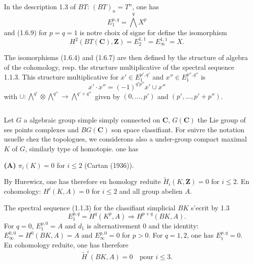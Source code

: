 \documentclass[11pt,a4paper]{article}
\theoremstyle{plain}
\theoremstyle{definition}
\begin{document}
In the description 1.3 of $BT$: $(BT)_n = T^n$, one has
\begin{equation}\label{1.6.9}
E_1^{p,q} = \bigwedge^q X^p
\end{equation}
and (1.6.9) for $p = q = 1$ is notre choix of signe for define the isomorphism
\begin{equation}\label{1.6.10}
H^2(BT(\mathbf{C}), \mathbf{Z}) = E_2^{1,1} = E_\infty^{1,1} = X.
\end{equation}

The isomorphisms (1.6.4) and (1.6.7) are then defined by the structure of algebra of the cohomology, resp. the structure multiplicative of the spectral sequence 1.1.3. This structure multiplicative for $x' \in E_1^{p',q'}$ and $x'' \in E_1^{p'',q''}$ is
\[
x' \cdot x'' = (-1)^{q'p''} x' \cup x''
\]
with $\cup : \bigwedge^{q'} \otimes \bigwedge^{q''} \to \bigwedge^{q'+q''}$ given by $(0, \ldots, p')$ and $(p', \ldots, p'+p'')$.

\subsection{}\label{1.7}

Let $G$ a algebraic group simple simply connected on $\mathbf{C}$, $G(\mathbf{C})$ the Lie group of ses points complexes and $BG(\mathbf{C})$ son space classifiant. For suivre the notation usuelle chez the topologues, we considerons also a under-group compact maximal $K$ of $G$, similarly type of homotopie. one has

\textbf{(A)} $\pi_i(K) = 0$ for $i \leq 2$ (Cartan (1936)).

By Hurewicz, one has therefore en homology reduite $\widetilde{H}_i(K, \mathbf{Z}) = 0$ for $i \leq 2$. En cohomology: $H^i(K, A) = 0$ for $i \leq 2$ and all group abelien $A$.

The spectral sequence (1.1.3) for the classifiant simplicial $BK$ s'ecrit by 1.3
\begin{equation}\label{1.7.1}
E_1^{p,q} = H^q(K^p, A) \Rightarrow H^{p+q}(BK, A).
\end{equation}
For $q = 0$, $E_1^{p,0} = A$ and $d_1$ is alternativement 0 and the identity: $E_\infty^{0,0} = H^0(BK, A) = A$ and $E_\infty^{p,0} = 0$ for $p > 0$. For $q = 1, 2$, one has $E_1^{p,q} = 0$. En cohomology reduite, one has therefore
\begin{equation}\label{1.7.2}
\widetilde{H}^i(BK, A) = 0 \quad \text{pour } i \leq 3.
\end{equation}
\end{document}
